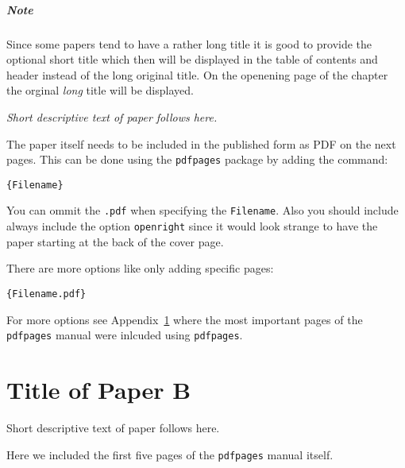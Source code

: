 \documentclass[%
norsk,     %
]{USN-BSc}
\begin{document}
\paragraph{Note}
Since some papers tend to have a rather long title it is good to provide the optional short title which then will be displayed in the table of contents and header instead of the long original title.
On the openening page of the chapter the orginal \emph{long} title will be displayed.\bigskip

\emph{Short descriptive text of paper follows here.}\bigskip

The paper itself needs to be included in the published form as PDF on the next pages.
This can be done using the \texttt{pdfpages} package by adding the command:

\begin{verbatim}
{Filename}
\end{verbatim}

You can ommit the \texttt{.pdf} when specifying the \texttt{Filename}. Also you should include always include the option \texttt{openright} since it would look strange to have the paper starting at the back of the cover page.

There are more options like only adding specific pages:
\begin{verbatim}
{Filename.pdf}
\end{verbatim}

For more options see Appendix~\ref{paper-b} where the most important pages of the \texttt{pdfpages} manual were inlcuded using \texttt{pdfpages}.




\chapter[Short Title of Paper B]{Title of Paper B}
\label{paper-b}
Short descriptive text of paper follows here.

Here we included the first five pages of the \texttt{pdfpages} manual itself.


\end{document}
